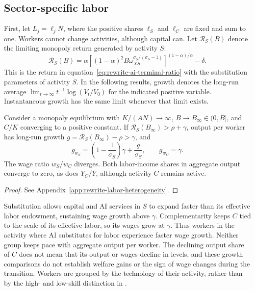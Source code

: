 \subsection{Sector-specific labor}
\label{subsec:rewrite-sector-specific-labor}

First, let $L_j=\ell_jN$, where the positive shares $\ell_S$ and $\ell_C$
are fixed and sum to one. Workers cannot change activities, although capital
can. Let $\mathcal R_S(B)$ denote the limiting monopoly return generated
by activity $S$:
\begin{equation}
 \mathcal R_S(B)=\alpha\left[(1-\alpha)^2B
 \omega_{XS}^{\sigma_S/(\sigma_S-1)}\right]^{(1-\alpha)/\alpha}-\delta.
 \label{eq:rewrite-heterogeneous-return}
\end{equation}
This is the return in equation~\eqref{eq:rewrite-ai-terminal-ratio}
with the substitution parameters of activity $S$.
In the following results, growth denotes the long-run average
$\lim_{t\to\infty}t^{-1}\log(V_t/V_0)$ for the indicated positive variable.
Instantaneous growth has the same limit whenever that limit exists.

\begin{proposition}
\label{prop:rewrite-heterogeneous-wages}
Consider a monopoly equilibrium with $K/(AN)\to\infty$,
$B\to B_\infty\in(0,\overline B]$, and $C/K$ converging to a positive
constant. If $\mathcal R_S(B_\infty)>\rho+\gamma$, output per worker
has long-run growth $g=\mathcal R_S(B_\infty)-\rho>\gamma$, and
\begin{equation}
 g_{w_S}=\left(1-\frac1{\sigma_S}\right)\gamma+\frac g{\sigma_S},
 \qquad g_{w_C}=\gamma.
 \label{eq:rewrite-heterogeneous-wage-growth}
\end{equation}
The wage ratio $w_S/w_C$ diverges. Both labor-income shares in aggregate
output converge to zero, as does $Y_C/Y$, although activity $C$ remains active.
\end{proposition}
\begin{proof}
See Appendix~\ref{app:rewrite-labor-heterogeneity}.
\end{proof}

Substitution allows capital and AI services in $S$ to expand faster than its
effective labor endowment, sustaining wage growth above $\gamma$.
Complementarity keeps $C$ tied to the scale of its effective labor, so its
wages grow at $\gamma$. Thus workers in the activity where AI substitutes
for labor experience faster wage growth. Neither group keeps pace with
aggregate output per worker. The declining output share of $C$ does not
mean that its output or wages decline in levels, and these growth comparisons
do not establish welfare gains or the sign of wage changes during the transition.
Workers are grouped by the technology of their activity, rather than by
the high- and low-skill distinction in \citet{hemousolsen2022}.

